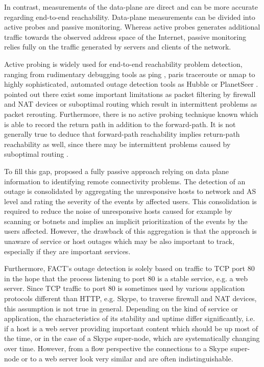 \documentclass{sigcomm-alternate}
\begin{document}
In contrast, measurements of the data-plane are direct and can be more accurate regarding end-to-end reachability. Data-plane measurements can be divided into active probes and passive monitoring. Whereas active probes generates additional traffic towards the observed address space of the Internet, passive monitoring relies fully on the traffic generated by servers and clients of the network.

Active probing is widely used for end-to-end reachability problem detection, ranging from rudimentary debugging tools as ping \cite{PING}, paris traceroute \cite{traceroute} or nmap \cite{Nmap} to highly sophisticated, automated outage detection tools as Hubble \cite{Katz:2008} or PlanetSeer \cite{Zhang:2004}. \cite{Bush:Optometry} pointed out there exist some important limitations as packet filtering by firewall and NAT devices or suboptimal routing which result in intermittent problems as packet rerouting. Furthermore, there is no active probing technique known which is able to record the return path in addition to the forward-path. It is not generally true to deduce that forward-path reachability implies return-path reachability as well, since there may be intermittent problems caused by suboptimal routing \cite{Bush:Optometry}.

To fill this gap, \cite{SchatzmannPAM2011} proposed a fully passive approach relying on data plane information to identifying remote connectivity problems. The detection of an outage is consolidated by aggregating the unresponsive hosts to network and AS level and rating the severity of the events by affected users. This consolidation is required to reduce the noise of unresponsive hosts caused for example by scanning or botnets and implies an implicit prioritization of the events by the users affected. However, the drawback of this aggregation is that the approach is unaware of service or host outages which may be also important to track, especially if they are important services.

Furthermore, FACT's outage detection is solely based on traffic to TCP port 80 in the hope that the process listening to port 80 is a stable service, e.g. a web server. Since TCP traffic to port 80 is sometimes used by various application protocols different than HTTP, e.g. Skype, to traverse firewall and NAT devices, this assumption is not true in general. Depending on the kind of service or application, the characteristics of its stability and uptime differ significantly, i.e. if a host is a web server providing important content which should be up most of the time, or in the case of a Skype super-node, which are systematically changing over time. However, from a flow perspective the connections to a Skype super-node or to a web server look very similar and are often indistinguishable.
\end{document}
